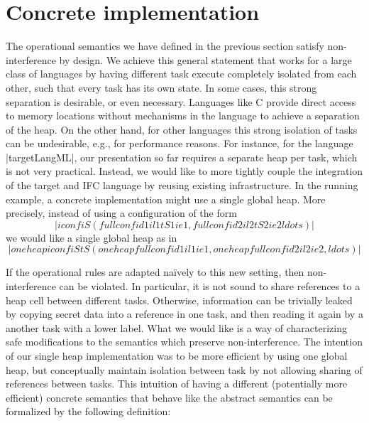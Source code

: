 \section{Concrete implementation}
\label{sec:concrete}

\newcommand{\con}[1]{\ensuremath{{\color{red} #1}}}
\newcommand{\abs}[1]{\ensuremath{{\color{blue} #1}}}

The operational semantics we have defined in the previous section
satisfy non-interference by design.
We achieve this general statement that works for a large class of
languages by having different task execute completely isolated from
each other, such that every task has its own state.
In some cases, this strong separation is desirable, or even necessary.
Languages like C provide direct access to memory locations without
mechanisms in the language to achieve a separation of the heap.
On the other hand, for other languages this
strong isolation of tasks can be
undesirable, e.g., for performance reasons.
For instance, for the language |targetLangML|, our presentation so far
requires a separate heap per task, which is not very practical.
Instead, we would like to
more tightly couple the integration of the target and IFC
language by reusing existing infrastructure.  In the running example,
a concrete implementation might use a single global heap.
More precisely, instead of using a configuration of the form
\[|iconf iS (fullconf id1 il1 tS1 ie1, fullconf id2 il2 tS2 ie2 ldots)|\]
we would like a single global heap as in
\[|oneheapiconf iS tS (oneheapfullconf id1 il1 ie1, oneheapfullconf id2 il2 ie2, ldots)|\]

If the operational rules are adapted na\"ively to this new setting,
then non-interference can be violated.  In particular, it is not
sound to share references to a heap cell between different tasks.
Otherwise, information can be trivially leaked by copying
secret data into a reference in one task, and then
reading it again by a another task with a lower label.
What we would like is a way of characterizing safe modifications to
the semantics which preserve non-interference.
The intention of our single heap implementation was to be more efficient
by using one global heap, but conceptually maintain isolation between
task by not allowing sharing of references between tasks.
This intuition of having a different (potentially more efficient)
concrete semantics that behave like the abstract semantics
can be formalized by the following definition:


